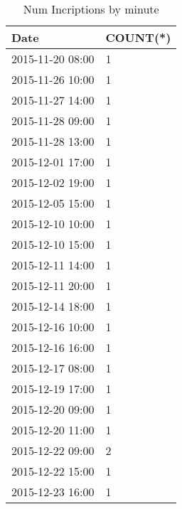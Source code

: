 \documentclass{article}
\begin{document}
\begin{table}[]
\centering
\caption{Num Incriptions by minute}
\label{lblNum Incriptions by minute}
\begin{tabular}{|ll|}
\textbf{Date} &\textbf{COUNT(*)} \\
\hline 
2015-11-20 08:00 & 1 \\
2015-11-26 10:00 & 1 \\
2015-11-27 14:00 & 1 \\
2015-11-28 09:00 & 1 \\
2015-11-28 13:00 & 1 \\
2015-12-01 17:00 & 1 \\
2015-12-02 19:00 & 1 \\
2015-12-05 15:00 & 1 \\
2015-12-10 10:00 & 1 \\
2015-12-10 15:00 & 1 \\
2015-12-11 14:00 & 1 \\
2015-12-11 20:00 & 1 \\
2015-12-14 18:00 & 1 \\
2015-12-16 10:00 & 1 \\
2015-12-16 16:00 & 1 \\
2015-12-17 08:00 & 1 \\
2015-12-19 17:00 & 1 \\
2015-12-20 09:00 & 1 \\
2015-12-20 11:00 & 1 \\
2015-12-22 09:00 & 2 \\
2015-12-22 15:00 & 1 \\
2015-12-23 16:00 & 1 \\
\end{tabular}
\end{table}
\end{document}
